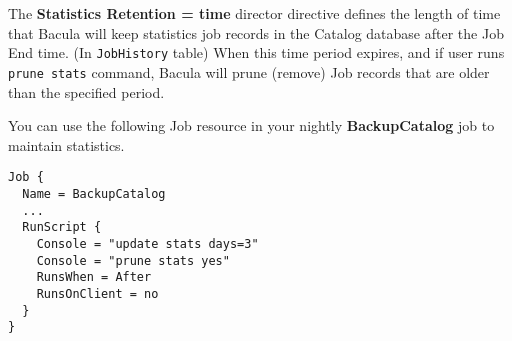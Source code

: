 The \textbf{Statistics Retention = \lt{}time\gt{}} director directive defines
the length of time that Bacula will keep statistics job records in the Catalog
database after the Job End time. (In \texttt{JobHistory} table) When this time
period expires, and if user runs \texttt{prune stats} command, Bacula will
prune (remove) Job records that are older than the specified period.

You can use the following Job resource in your nightly \textbf{BackupCatalog}
job to maintain statistics.
\begin{verbatim}
Job {
  Name = BackupCatalog
  ...
  RunScript {
    Console = "update stats days=3"
    Console = "prune stats yes"
    RunsWhen = After
    RunsOnClient = no
  }
}
\end{verbatim}
